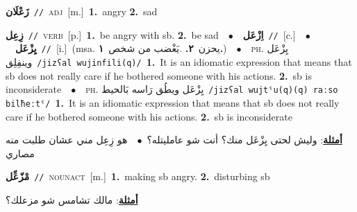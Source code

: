 \documentclass[10pt,a4paper,twoside]{article} %
\begin{document}
\begin{multicols}{2}
{\setlength\topsep{0pt}\textbf{\foreignlanguage{arabic}{زَعْلَان}}\ {\color{gray}\texttt{//}\color{black}}\ \textsc{adj}\ [m.]\ \textbf{1.}~angry  \textbf{2.}~sad\ } \vspace{2mm}

{\setlength\topsep{0pt}\textbf{\foreignlanguage{arabic}{زِعِل}}\ {\color{gray}\texttt{//}\color{black}}\ \textsc{verb}\ [p.]\ \textbf{1.}~be angry with sb.  \textbf{2.}~be sad\ \ $\bullet$\ \ \setlength\topsep{0pt}\textbf{\foreignlanguage{arabic}{اِزْعَل}}\ {\color{gray}\texttt{//}\color{black}}\ [c.]\ \ $\bullet$\ \ \setlength\topsep{0pt}\textbf{\foreignlanguage{arabic}{يِزْعَل}}\ {\color{gray}\texttt{//}\color{black}}\ [i.]\ \color{gray}(msa. \foreignlanguage{arabic}{يحزن}~\foreignlanguage{arabic}{\textbf{٢.}}  .\foreignlanguage{arabic}{يَغْضب من شخص}~\foreignlanguage{arabic}{\textbf{١.}})\color{black}\ \ $\bullet$\ \ \textsc{ph.} \color{gray} \foreignlanguage{arabic}{يِزْعَل وينفِلِق}\color{black}\ {\color{gray}\texttt{/{\sffamily jizʕal wujinfili(q)}/}\color{black}}\ \textbf{1.}~It is an idiomatic expression that means that sb does not really care if he bothered someone with his actions.  \textbf{2.}~sb is inconsiderate\ \ $\bullet$\ \ \textsc{ph.} \color{gray} \foreignlanguage{arabic}{يِزْعَل ويطُق رَاسه بَالحيط}\color{black}\ {\color{gray}\texttt{/{\sffamily jizʕal wujtˤu(q)(q) raːso bilħeːtˤ}/}\color{black}}\ \textbf{1.}~It is an idiomatic expression that means that sb does not really care if he bothered someone with his actions.  \textbf{2.}~sb is inconsiderate\  \begin{flushright}\color{gray}\foreignlanguage{arabic}{\textbf{\underline{\foreignlanguage{arabic}{أمثلة}}}: وليش لحتى يِزْعَل منك؟ أنت شو عامليتله؟\ $\bullet$\ \  هو زِعِل مني عشان طلبت منه مصاري}\end{flushright}\color{black}} \vspace{2mm}

{\setlength\topsep{0pt}\textbf{\foreignlanguage{arabic}{مْزّعِّل}}\ {\color{gray}\texttt{//}\color{black}}\ \textsc{noun\textunderscore act}\ [m.]\ \textbf{1.}~making sb angry.  \textbf{2.}~disturbing sb\  \begin{flushright}\color{gray}\foreignlanguage{arabic}{\textbf{\underline{\foreignlanguage{arabic}{أمثلة}}}: مالك تشامس شو مزعلك؟}\end{flushright}\color{black}} \vspace{2mm}


\end{multicols}
\end{document}

